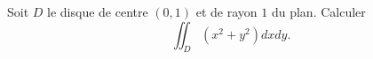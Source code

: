\begin{exercice}\label{exoIntegralesMultiples0003}


Soit $D$ le disque de centre $(0,1)$ et de rayon $1$ du plan. Calculer 
\begin{equation}
\iint_D (x^2+y^2) dx dy.
\end{equation}


\end{exercice}
